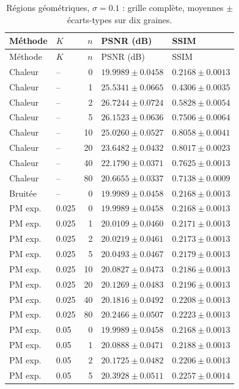 \begin{longtable}{llrll}
\caption{Régions géométriques, $\sigma=0.1$ : grille complète, moyennes $\pm$ écarts-types sur dix graines.}\\
\toprule
Méthode & $K$ & $n$ & PSNR (dB) & SSIM \\
\midrule
\endfirsthead
\toprule
Méthode & $K$ & $n$ & PSNR (dB) & SSIM \\
\midrule
\endhead
\bottomrule
\endfoot
Chaleur & -- & 0 & $19.9989 \pm 0.0458$ & $0.2168 \pm 0.0013$ \\
Chaleur & -- & 1 & $25.5341 \pm 0.0665$ & $0.4306 \pm 0.0035$ \\
Chaleur & -- & 2 & $26.7244 \pm 0.0724$ & $0.5828 \pm 0.0054$ \\
Chaleur & -- & 5 & $26.1523 \pm 0.0636$ & $0.7506 \pm 0.0064$ \\
Chaleur & -- & 10 & $25.0260 \pm 0.0527$ & $0.8058 \pm 0.0041$ \\
Chaleur & -- & 20 & $23.6482 \pm 0.0432$ & $0.8017 \pm 0.0023$ \\
Chaleur & -- & 40 & $22.1790 \pm 0.0371$ & $0.7625 \pm 0.0013$ \\
Chaleur & -- & 80 & $20.6655 \pm 0.0337$ & $0.7138 \pm 0.0009$ \\
Bruitée & -- & 0 & $19.9989 \pm 0.0458$ & $0.2168 \pm 0.0013$ \\
PM exp. & 0.025 & 0 & $19.9989 \pm 0.0458$ & $0.2168 \pm 0.0013$ \\
PM exp. & 0.025 & 1 & $20.0109 \pm 0.0460$ & $0.2171 \pm 0.0013$ \\
PM exp. & 0.025 & 2 & $20.0219 \pm 0.0461$ & $0.2173 \pm 0.0013$ \\
PM exp. & 0.025 & 5 & $20.0493 \pm 0.0467$ & $0.2179 \pm 0.0013$ \\
PM exp. & 0.025 & 10 & $20.0827 \pm 0.0473$ & $0.2186 \pm 0.0013$ \\
PM exp. & 0.025 & 20 & $20.1269 \pm 0.0483$ & $0.2196 \pm 0.0013$ \\
PM exp. & 0.025 & 40 & $20.1816 \pm 0.0492$ & $0.2208 \pm 0.0013$ \\
PM exp. & 0.025 & 80 & $20.2466 \pm 0.0507$ & $0.2223 \pm 0.0013$ \\
PM exp. & 0.05 & 0 & $19.9989 \pm 0.0458$ & $0.2168 \pm 0.0013$ \\
PM exp. & 0.05 & 1 & $20.0888 \pm 0.0471$ & $0.2188 \pm 0.0013$ \\
PM exp. & 0.05 & 2 & $20.1725 \pm 0.0482$ & $0.2206 \pm 0.0013$ \\
PM exp. & 0.05 & 5 & $20.3928 \pm 0.0511$ & $0.2257 \pm 0.0014$ \\

\end{longtable}
